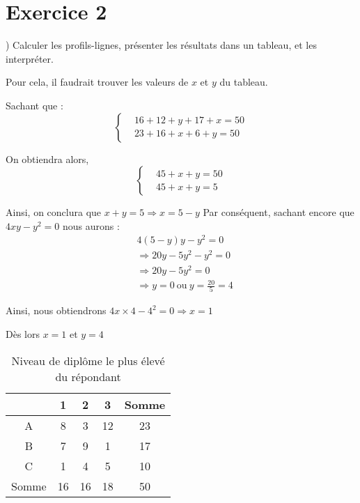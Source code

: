 \newpage \section*{Exercice 2}
	
	) Calculer les profils-lignes, présenter les résultats dans un tableau, et les interpréter.
	
	Pour cela, il faudrait trouver les valeurs de $x$ et $y$ du tableau.
	
	Sachant que :
	\[
	\left\{
	\begin{aligned}
		& 16+12 + y+17+x=50 \\
		& 23+16+x+6+y=50
	\end{aligned}
	\right.
	\]
	
	On obtiendra alors,
	\[
	\left\{
	\begin{aligned}
		& 45+x+y=50 \\
		& 45+x+y=5
	\end{aligned}
	\right.
	\]
	
	Ainsi, on conclura que $x+y=5 \Rightarrow x=5-y$ Par conséquent, sachant encore que $4xy-y^2=0$ nous aurons :
	\begin{align}
		& 4(5-y)y-y^2=0  \nonumber \\
		& \Rightarrow 20y-5y^2-y^2 = 0 \nonumber \\
		& \Rightarrow 20y-5y^2=0 \nonumber \\
		& \Rightarrow y=0 \ \text{ou} \ y=\frac{20}{5}=4 \nonumber
	\end{align}
	
	Ainsi, nous obtiendrons $4x \times 4 -4^2=0 \Rightarrow x=1$
	
	Dès lors $x=1$ et $y=4$
	
	\begin{table}[htbp]
		\centering
		\begin{tabular}{c|c|c|c|c}
			\cline{2-5}
			& 1      & 2      & 3      & Somme \\  \hline
			A      & 8      & 3      & 12     & 23 \\ \hline
			B      & 7      & 9      & 1      & 17 \\ \hline
			C      & 1      & 4      & 5      & 10 \\ \hline
			Somme  & 16     & 16     & 18     & 50 \\ \hline
		\end{tabular}%
		\caption{Niveau de diplôme le plus élevé du répondant}
	\end{table}%
	
